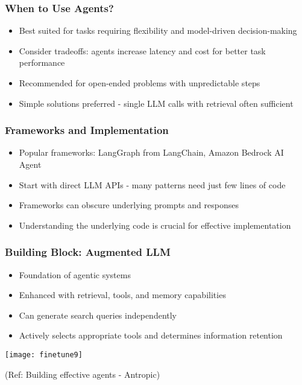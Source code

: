 \begin{frame}[fragile]\frametitle{When to Use Agents?}
    \begin{itemize}
        \item Best suited for tasks requiring flexibility and model-driven decision-making
        \item Consider tradeoffs: agents increase latency and cost for better task performance
        \item Recommended for open-ended problems with unpredictable steps
        \item Simple solutions preferred - single LLM calls with retrieval often sufficient
    \end{itemize}
\end{frame}

\begin{frame}[fragile]\frametitle{Frameworks and Implementation}
    \begin{itemize}
        \item Popular frameworks: LangGraph from LangChain, Amazon Bedrock AI Agent
        \item Start with direct LLM APIs - many patterns need just few lines of code
        \item Frameworks can obscure underlying prompts and responses
        \item Understanding the underlying code is crucial for effective implementation
    \end{itemize}
\end{frame}

\begin{frame}[fragile]\frametitle{Building Block: Augmented LLM}
    \begin{itemize}
        \item Foundation of agentic systems
        \item Enhanced with retrieval, tools, and memory capabilities
        \item Can generate search queries independently
        \item Actively selects appropriate tools and determines information retention
    \end{itemize}
	
	\begin{center}
	\texttt{[image: finetune9]}
	\end{center}

	{\tiny (Ref: Building effective agents - Antropic)}
	
\end{frame}

